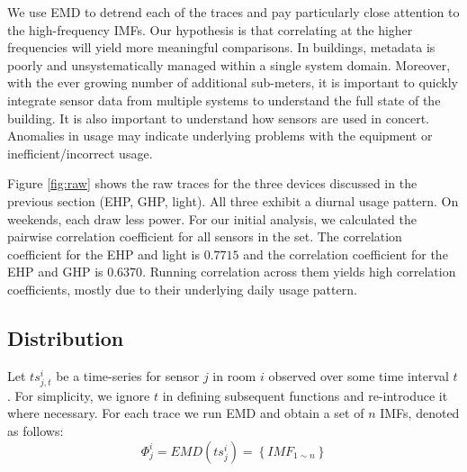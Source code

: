 We use EMD to detrend each of the traces and pay particularly close attention to the high-frequency IMFs.  Our 
hypothesis is that correlating at the higher frequencies will yield more meaningful comparisons.
In buildings, metadata is poorly and unsystematically managed within a single system domain.  Moreover, 
with the ever growing number of additional sub-meters, it is important to quickly integrate
sensor data from multiple systems to understand the full state of the building.  It is also important to 
understand how sensors are used in concert.  Anomalies in usage may indicate underlying problems with 
the equipment or inefficient/incorrect usage.  

Figure \ref{fig:raw} shows the raw traces for the three devices discussed in 
the previous section (EHP, GHP, light). All three exhibit a diurnal usage pattern.  On weekends, each
draw less power.   For our initial analysis, we calculated the pairwise 
correlation coefficient for all sensors in the set.  The correlation coefficient for 
 the EHP and light is $0.7715$ and the correlation coefficient for the EHP and GHP is $0.6370$.
Running correlation across them yields high correlation coefficients, mostly
due to their underlying daily usage pattern.




\subsection{Distribution}
Let $ts^{i}_{j,t}$ be a time-series for sensor $j$ in room $i$ observed over some time interval $t$.  For simplicity, we ignore
$t$ in defining subsequent functions and re-introduce it where necessary.
For each trace we run EMD and obtain a set of $n$ IMFs, denoted as follows:
\begin{displaymath}
\Phi^i_j = EMD(ts^i_j) = \left \{ IMF_{1\sim n} \right \}
\end{displaymath}

